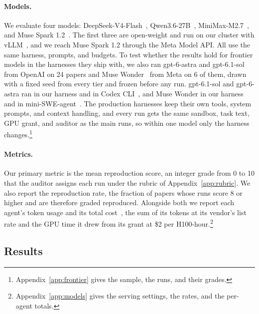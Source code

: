 \documentclass{article} %
\newcommand{\todo}[1]{#1}%
\begin{document}
\paragraph{Models.} We evaluate four models:
DeepSeek-V4-Flash~\citep{deepseekai2026deepseekv4highlyefficientmilliontoken,deepseekai2026flashcard},
Qwen3.6-27B~\citep{qwen3.6-27b}, MiniMax-M2.7~\citep{minimax2026m2}, and
Muse Spark 1.2~\citep{meta2026musespark}. The first three are open-weight and
run on our cluster with vLLM~\citep{kwon2023vllm}, and we reach Muse Spark 1.2 through the Meta
Model API. All use the same harness, prompts, and budgets. To test whether the
results hold for frontier models in the harnesses they ship with, we also ran
\todo{gpt-6-astra and gpt-6.1-sol}~\citep{openai2026gpt6astra,openai2026gpt61sol} from OpenAI on \todo{24} papers and
Muse Wonder~\citep{meta2026musewonder} from Meta on \todo{6} of them, drawn with a fixed seed from
every tier and frozen before any run. gpt-6.1-sol and gpt-6-astra ran in our
harness and in Codex CLI~\citep{openai2026codexcli}, and Muse Wonder in our
harness and in mini-SWE-agent~\citep{yang2024sweagent}. The production
harnesses keep their own tools, system prompts, and context handling, and every
run gets the same sandbox, task text, GPU grant, and auditor as the main runs,
so within one model only the harness changes.\footnote{Appendix~\ref{app:frontier}
gives the sample, the runs, and their grades.}

\paragraph{Metrics.} Our primary metric is the mean reproduction score, an
integer grade from 0 to 10 that the auditor assigns each run
under the rubric of Appendix~\ref{app:rubric}. We also report the
reproduction rate, the fraction of papers whose runs score 8 or higher and
are therefore graded reproduced. Alongside both we report each agent's token
usage and its total cost~\citep{kapoor2024agents,kapoor2026hal}, the sum of its tokens at its
vendor's list rate and the GPU time it drew from its grant at \$2 per
H100-hour.\footnote{Appendix~\ref{app:models} gives the serving settings, the
rates, and the per-agent totals.}

\subsection{Results}
\label{subsec:results}
\end{document}
